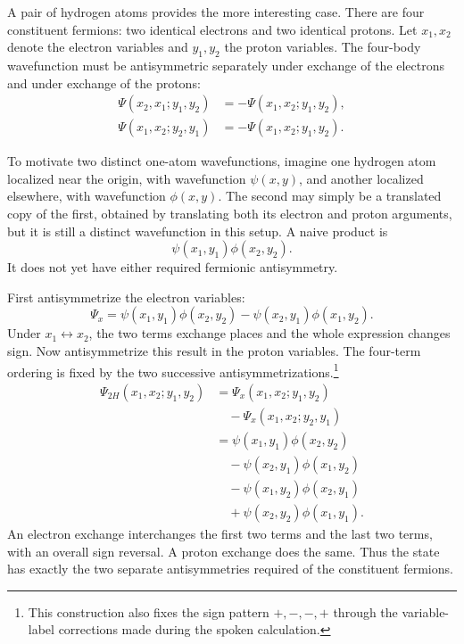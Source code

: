 A pair of hydrogen atoms provides the more interesting case. There are four constituent fermions: two identical electrons and two identical protons. Let \(x_1,x_2\) denote the electron variables and \(y_1,y_2\) the proton variables. The four-body wavefunction must be antisymmetric separately under exchange of the electrons and under exchange of the protons:
\begin{align}
\Psi(x_2,x_1;y_1,y_2)
&=-\Psi(x_1,x_2;y_1,y_2),\\
\Psi(x_1,x_2;y_2,y_1)
&=-\Psi(x_1,x_2;y_1,y_2).
\end{align}

To motivate two distinct one-atom wavefunctions, imagine one hydrogen atom localized near the origin, with wavefunction \(\psi(x,y)\), and another localized elsewhere, with wavefunction \(\phi(x,y)\). The second may simply be a translated copy of the first, obtained by translating both its electron and proton arguments, but it is still a distinct wavefunction in this setup. A naive product is
\begin{equation}
\psi(x_1,y_1)\phi(x_2,y_2).
\end{equation}
It does not yet have either required fermionic antisymmetry.

First antisymmetrize the electron variables:
\begin{equation}
\Psi_x=
\psi(x_1,y_1)\phi(x_2,y_2)
-\psi(x_2,y_1)\phi(x_1,y_2).
\end{equation}
Under \(x_1\leftrightarrow x_2\), the two terms exchange places and the whole expression changes sign. Now antisymmetrize this result in the proton variables. The four-term ordering is fixed by the two successive antisymmetrizations.\footnote{This construction also fixes the sign pattern \(+,-,-,+\) through the variable-label corrections made during the spoken calculation.}
\begin{align}
\Psi_{2H}(x_1,x_2;y_1,y_2)
&=\Psi_x(x_1,x_2;y_1,y_2)\nonumber\\
&\quad{}-\Psi_x(x_1,x_2;y_2,y_1)\\
&=\psi(x_1,y_1)\phi(x_2,y_2)\nonumber\\
&\quad{}-\psi(x_2,y_1)\phi(x_1,y_2)\nonumber\\
&\quad{}-\psi(x_1,y_2)\phi(x_2,y_1)\nonumber\\
&\quad{}+\psi(x_2,y_2)\phi(x_1,y_1).
\label{eq:two-hydrogen-antisymmetrized}
\end{align}
An electron exchange interchanges the first two terms and the last two terms, with an overall sign reversal. A proton exchange does the same. Thus the state has exactly the two separate antisymmetries required of the constituent fermions.


